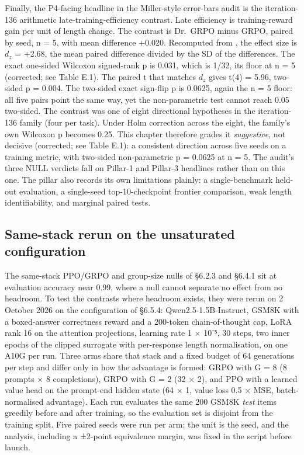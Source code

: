 \documentclass[12pt,a4paper]{report}
\newcommand{\longtok}[1]{\texttt{\seqsplit{#1}}}
\begin{document}
Finally, the P4-facing headline in the Miller-style error-bars audit is
the iteration-136 arithmetic late-training-efficiency contrast. Late
efficiency is training-reward gain per unit of length change. The
contrast is Dr.~GRPO minus GRPO, paired by seed, n = 5, with mean
difference +0.020. Recomputed from
\longtok{length\_\allowbreak{}bias\_\allowbreak{}iter136\_\allowbreak{}step\_\allowbreak{}coupling.tsv}, the effect size is
\(d_z\) = +2.68, the mean paired difference divided by the SD of the
differences. The exact one-sided Wilcoxon signed-rank p is 0.031, which
is 1/32, its floor at n = 5 (corrected; see Table E.1). The paired t
that matches \(d_z\) gives t(4) = 5.96, two-sided p = 0.004. The
two-sided exact sign-flip p is 0.0625, again the n = 5 floor: all five
pairs point the same way, yet the non-parametric test cannot reach 0.05
two-sided. The contrast was one of eight directional hypotheses in the
iteration-136 family (four per task). Under Holm correction across the
eight, the family's own Wilcoxon p becomes 0.25. This chapter therefore
grades it \emph{suggestive}, not decisive (corrected; see Table E.1): a
consistent direction across five seeds on a training metric, with
two-sided non-parametric p = 0.0625 at n = 5. The audit's three NULL
verdicts fall on Pillar-1 and Pillar-3 headlines rather than on this
one. The pillar also records its own limitations plainly: a
single-benchmark held-out evaluation, a single-seed top-10-checkpoint
frontier comparison, weak length identifiability, and marginal paired
tests.

\subsection{Same-stack rerun on the unsaturated
configuration}\label{same-stack-rerun-on-the-unsaturated-configuration}

The same-stack PPO/GRPO and group-size nulls of §6.2.3 and §6.4.1 sit at
evaluation accuracy near 0.99, where a null cannot separate no effect
from no headroom. To test the contrasts where headroom exists, they were
rerun on 2 October 2026 on the configuration of §6.5.4:
Qwen2.5-1.5B-Instruct, GSM8K with a boxed-answer correctness reward and
a 200-token chain-of-thought cap, LoRA rank 16 on the attention
projections, learning rate 1 × 10⁻⁵, 30 steps, two inner epochs of the
clipped surrogate with per-response length normalisation, on one A10G
per run. Three arms share that stack and a fixed budget of 64
generations per step and differ only in how the advantage is formed:
GRPO with G = 8 (8 prompts × 8 completions), GRPO with G = 2 (32 × 2),
and PPO with a learned value head on the prompt-end hidden state (64 ×
1, value loss 0.5 × MSE, batch-normalised advantage). Each run evaluates
the same 200 GSM8K \emph{test} items greedily before and after training,
so the evaluation set is disjoint from the training split. Five paired
seeds were run per arm; the unit is the seed, and the analysis,
including a ±2-point equivalence margin, was fixed in the script before
launch.
\end{document}
